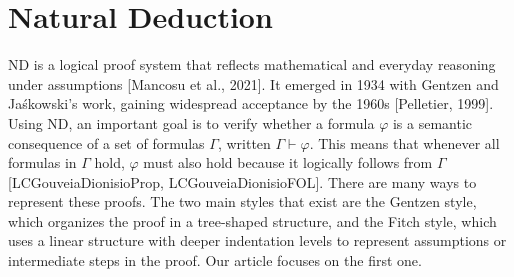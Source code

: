 \documentclass[runningheads]{llncs}
\begin{document}
\section{Natural Deduction}

ND is a logical proof system that reflects mathematical and everyday reasoning under assumptions [Mancosu et al., 2021]. It emerged in 1934 with Gentzen and Jaśkowski's work, gaining widespread acceptance by the 1960s [Pelletier, 1999]. Using ND, an important goal is to verify whether a formula \(\varphi\) is a semantic consequence of a set of formulas \(\Gamma\), written \(\Gamma \vdash \varphi\). This means that whenever all formulas in \(\Gamma\) hold, \(\varphi\) must also hold because it logically follows from \(\Gamma\) [LCGouveiaDionisioProp, LCGouveiaDionisioFOL]. There are many ways to represent these proofs. The two main styles that exist are the Gentzen style, which organizes the proof in a tree-shaped structure, and the Fitch style, which uses a linear structure with deeper indentation levels to represent assumptions or intermediate steps in the proof. Our article focuses on the first one. 
\end{document}
